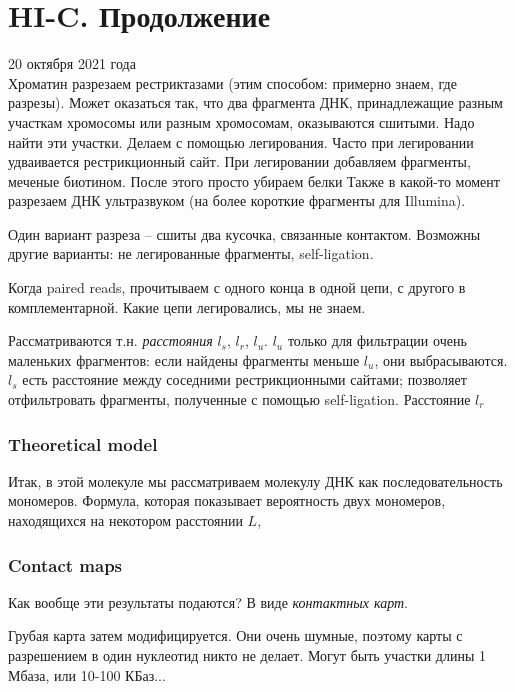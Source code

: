 \documentclass[main.tex]{subfiles}
\begin{document}
\section{HI-C. Продолжение}
20 октября 2021 года \\

Хроматин разрезаем рестриктазами (этим способом: примерно знаем, где разрезы).
Может оказаться так, что два фрагмента ДНК, принадлежащие разным участкам хромосомы или разным хромосомам, оказываются сшитыми.
Надо найти эти участки.
Делаем с помощью легирования.
Часто при легировании удваивается рестрикционный сайт.
При легировании добавляем фрагменты, меченые биотином.
После этого просто убираем белки %
Также в какой-то момент разрезаем ДНК ультразвуком (на более короткие фрагменты для Illumina).

Один вариант разреза -- сшиты два кусочка, связанные контактом.
Возможны другие варианты: не легированные фрагменты, self-ligation.


Когда paired reads, прочитываем с одного конца в одной цепи, с другого в комплементарной.
Какие цепи легировались, мы не знаем.

Рассматриваются т.н. \emph{расстояния} $ l_s $, $ l_r $, $ l_u $.
 $ l_u $ только для фильтрации очень маленьких фрагментов: если найдены фрагменты меньше $ l_u $, они выбрасываются.
 $ l_s $ есть расстояние между соседними рестрикционными сайтами; позволяет отфильтровать фрагменты, полученные с помощью self-ligation.
 Расстояние $ l_r $ %
 
 \subsubsection{Theoretical model}
 
 Итак, в этой молекуле мы рассматриваем молекулу ДНК как последовательность мономеров.
 Формула, которая показывает вероятность двух мономеров, находящихся на некотором расстоянии $ L $, %
 
 \subsubsection{Contact maps}
 
 Как вообще эти результаты подаются?
 В виде \emph{контактных карт}.
 
 Грубая карта затем модифицируется.
 Они очень шумные, поэтому карты с разрешением в один нуклеотид никто не делает.
 Могут быть участки длины 1 Мбаза, или 10-100 КБаз...
 
\end{document}
